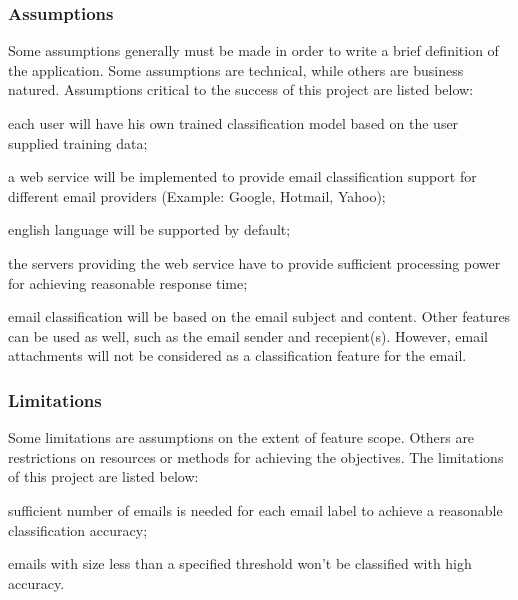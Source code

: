\subsubsection{Assumptions}
Some assumptions generally must be made in order to write a brief definition 
of the application. Some assumptions are technical, while others are business natured.  Assumptions 
critical to the success of this project are listed below:
\begin{my_itemize}
  \item each user will have his own trained classification model based on the user supplied training data;
  \item a web service will be implemented to provide email classification support for different email 
	providers (Example: Google, Hotmail, Yahoo);
  \item english language will be supported by default;
  \item the servers providing the web service have to provide sufficient 
	processing power for achieving reasonable response time;
  \item email classification will be based on the email subject and content. 
	Other features can be used as well, such as the email sender and recepient(s). 
	However, email attachments will not be considered as a classification feature for the email.
\end{my_itemize}

\subsubsection{Limitations}
Some limitations are assumptions on the extent of feature scope. Others are restrictions on resources 
or methods for achieving the objectives. The limitations of this project are listed below:

\begin{my_itemize}
  \item sufficient number of emails is needed for each email label to achieve 
	a reasonable classification accuracy;
  \item emails with size less than a specified threshold won't be classified with
  high accuracy.
\end{my_itemize}

